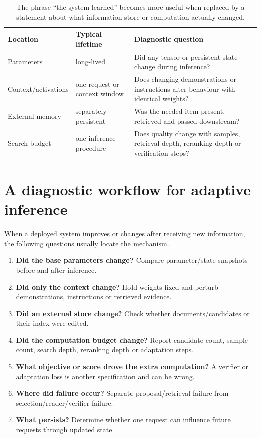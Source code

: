 \begin{table}[ht]
\centering
\small
\begin{tabular}{p{}p{}p{}}
\toprule
Location & Typical lifetime & Diagnostic question \\
\midrule
Parameters & long-lived & Did any tensor or persistent state change during inference? \\
Context/activations & one request or context window & Does changing demonstrations or instructions alter behaviour with identical weights? \\
External memory & separately persistent & Was the needed item present, retrieved and passed downstream? \\
Search budget & one inference procedure & Does quality change with samples, retrieval depth, reranking depth or verification steps? \\
\bottomrule
\end{tabular}
\caption{The phrase ``the system learned'' becomes more useful when replaced by a statement about what information store or computation actually changed.}
\label{tab:week11-information-locations}
\end{table}

\section{A diagnostic workflow for adaptive inference}

When a deployed system improves or changes after receiving new information, the following questions usually locate the mechanism.

\begin{enumerate}[leftmargin=*]
  \item \textbf{Did the base parameters change?} Compare parameter/state snapshots before and after inference.
  \item \textbf{Did only the context change?} Hold weights fixed and perturb demonstrations, instructions or retrieved evidence.
  \item \textbf{Did an external store change?} Check whether documents/candidates or their index were edited.
  \item \textbf{Did the computation budget change?} Report candidate count, sample count, search depth, reranking depth or adaptation steps.
  \item \textbf{What objective or score drove the extra computation?} A verifier or adaptation loss is another specification and can be wrong.
  \item \textbf{Where did failure occur?} Separate proposal/retrieval failure from selection/reader/verifier failure.
  \item \textbf{What persists?} Determine whether one request can influence future requests through updated state.
\end{enumerate}

